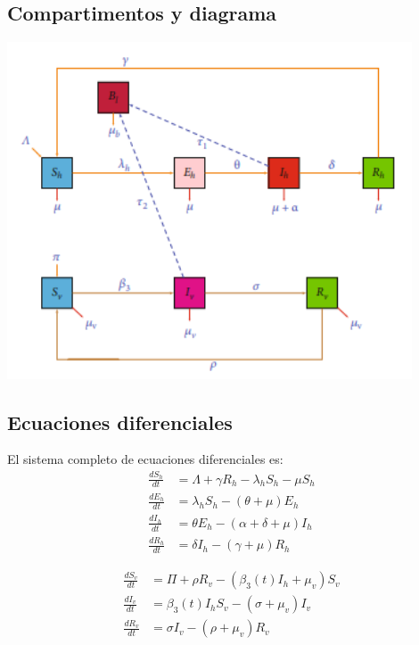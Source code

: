 \documentclass[12pt,a4paper]{article}
\begin{document}
\subsection{Compartimentos y diagrama}
\begin{center}
\includegraphics[width=0.9\textwidth]{Images/modelo_seir.png}
\captionsetup{hypcap=false}
\end{center}

\subsection{Ecuaciones diferenciales}

El sistema completo de ecuaciones diferenciales es:
\begin{align*}
\frac{dS_h}{dt} &= \Lambda + \gamma R_h - \lambda_h S_h - \mu S_h \\
\frac{dE_h}{dt} &= \lambda_h S_h - (\theta + \mu) E_h \\
\frac{dI_h}{dt} &= \theta E_h - (\alpha + \delta + \mu) I_h \\
\frac{dR_h}{dt} &= \delta I_h - (\gamma + \mu) R_h
\end{align*}

\begin{align*}
\frac{dS_v}{dt} &= \Pi + \rho R_v - (\beta_3(t) I_h + \mu_v) S_v \\
\frac{dI_v}{dt} &= \beta_3(t) I_h S_v - (\sigma + \mu_v) I_v \\
\frac{dR_v}{dt} &= \sigma I_v - (\rho + \mu_v) R_v
\end{align*}
\end{document}
